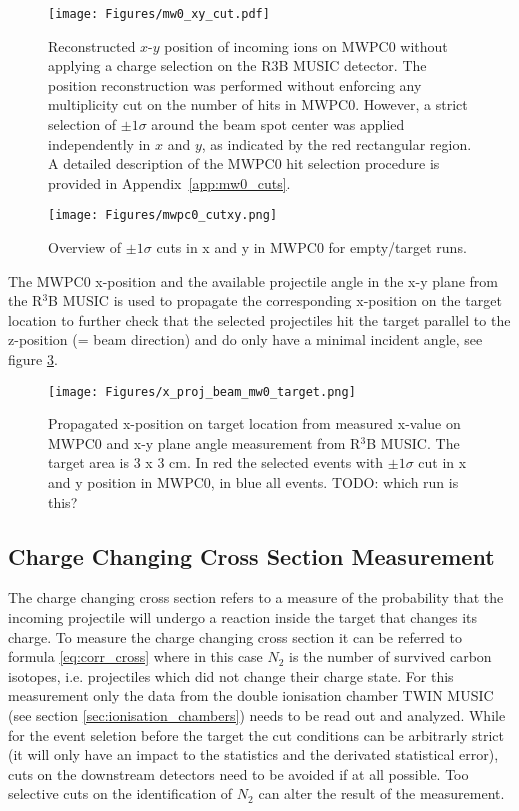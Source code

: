 \begin{enumerate}
\begin{figure}
\centering
\texttt{[image: Figures/mw0\_xy\_cut.pdf]}
\caption{Reconstructed \(x\)-\(y\) position of incoming ions on MWPC0 without applying a charge selection on the R3B MUSIC detector. The position reconstruction was performed without enforcing any multiplicity cut on the number of hits in MWPC0. However, a strict selection of \(\pm1\sigma\) around the beam spot center was applied independently in \(x\) and \(y\), as indicated by the red rectangular region. A detailed description of the MWPC0 hit selection procedure is provided in Appendix~\ref{app:mw0_cuts}.}
\label{fig:mw0_xy_overview}
\end{figure}
\begin{figure}
\centering
\texttt{[image: Figures/mwpc0\_cutxy.png]}
\caption{Overview of $\pm 1\sigma$ cuts in x and y in MWPC0 for empty/target runs.}
\label{fig:mw0_cuts}
\end{figure}
The MWPC0 x-position and the available projectile angle in the x-y plane from the R$^3$B MUSIC is used to propagate the corresponding x-position on the target location to further check that the selected projectiles hit the target parallel to the z-position (= beam direction) and do only have a minimal incident angle, see figure \ref{fig:x_pos_target}. 
\begin{figure}[htpb]
    \centering
    \texttt{[image: Figures/x\_proj\_beam\_mw0\_target.png]}
    \caption{
   	Propagated x-position on target location from measured x-value on MWPC0 and x-y plane angle measurement from R$^3$B MUSIC. The target area is 3 x 3 cm. In red the selected events with $\pm 1\sigma$ cut in x and y position in MWPC0, in blue all events. TODO: which run is this?
    }
    \label{fig:x_pos_target}
\end{figure}
\end{enumerate}
\subsection{Charge Changing Cross Section Measurement}\label{subsec:cc_cs}
The charge changing cross section refers to a measure of the probability that the incoming projectile will undergo a reaction inside the target that changes its charge. To measure the charge changing cross section it can be referred to formula \ref{eq:corr_cross} where in this case $N_2$ is the number of survived carbon isotopes, i.e. projectiles which did not change their charge state. For this measurement only the data from the double ionisation chamber TWIN MUSIC (see section \ref{sec:ionisation_chambers}) needs to be read out and analyzed.\newline
While for the event seletion before the target the cut conditions can be arbitrarly strict (it will only have an impact to the statistics and the derivated statistical error), cuts on the downstream detectors need to be avoided if at all possible. Too selective cuts on the identification of $N_2$ can alter the result of the measurement.
